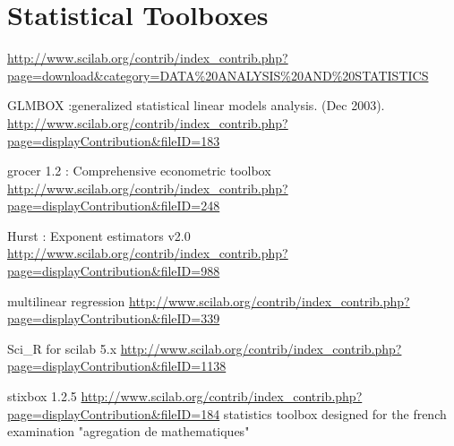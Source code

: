 \chapter{Statistical Toolboxes}

\url{http://www.scilab.org/contrib/index_contrib.php?page=download&category=DATA%20ANALYSIS%20AND%20STATISTICS}

GLMBOX :generalized statistical linear models analysis. (Dec 2003).
\url{http://www.scilab.org/contrib/index_contrib.php?page=displayContribution&fileID=183}

grocer 1.2 : Comprehensive econometric toolbox
\url{http://www.scilab.org/contrib/index_contrib.php?page=displayContribution&fileID=248}

Hurst : Exponent estimators v2.0
\url{http://www.scilab.org/contrib/index_contrib.php?page=displayContribution&fileID=988}

multilinear regression
\url{http://www.scilab.org/contrib/index_contrib.php?page=displayContribution&fileID=339}

Sci\_R for scilab 5.x
\url{http://www.scilab.org/contrib/index_contrib.php?page=displayContribution&fileID=1138}

stixbox 1.2.5
\url{http://www.scilab.org/contrib/index_contrib.php?page=displayContribution&fileID=184}
statistics toolbox designed for the french examination "agregation de mathematiques"

